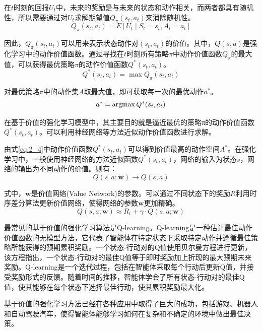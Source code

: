在$t$时刻的回报$U_t$中，未来的奖励是与未来的状态和动作相关，而两者都具有随机性，所以需要通过对$U_t$求解期望值$Q_π (s_t,a_t)$来消除随机性\cite{XTYY202012003}。
\begin{equation}
  \label{eq:2_2}
  Q_π (s_t,a_t) = E[U_t\mid S_t=s_t, A_t = a_t]
\end{equation}

因此，$Q_\pi(s_t,a_t)$可以用来表示状态动作对$(s_t,a_t)$的价值。其中，$Q(s,a)$是强化学习中的动作价值函数。通过寻找在$t$时刻所有策略$\pi$中动作价值函数$Q_\pi$的最大值，可以获得最优策略$\pi$的动作价值函数$Q^*(s_t,a_t)$。
\begin{equation}
  \label{eq:2_3}
  Q^* (s_t,a_t) = \max Q_π (s_t,a_t)
\end{equation}

对最优策略$\pi$中的动作集$A$取最大值，即可获取每一次的最优动作$a^*$。
\begin{equation}
  \label{eq:2_4}
  a^* = \operatorname*{argmax} Q^* (s_t,a_t)
\end{equation}

在基于价值的强化学习模型中，其主要目的就是逼近最优的策略π的动作价值函数$Q^* (s_t,a_t )$。可以利用神经网络等方法近似动作价值函数进行求解。

由式\ref{eq:2_4}中动作价值函数$Q^* (s_t,a_t )$可以得到价值最高的动作空间$A^*$。在强化学习中，一般使用神经网络的方法近似函数$Q^* (s_t,a_t )$，网络的输入为状态$s$，网络的输出为不同动作的价值。则有：
\begin{equation}
  \label{eq:2_5}
  Q(s,a;\mathbf{w}) \rightarrow Q(s,a)
\end{equation}

	式中，$\mathbf{w}$是价值网络(Value Network)的参数。可以通过不同状态下的奖励$R$利用时序差分算法更新价值网络，使得网络的参数$\mathbf{w}$更加精确。
\begin{equation}
  \label{eq:2_6}
  Q(s,a;\mathbf{w}) \approx R_t + \gamma \cdot Q(s,a;\mathbf{w})
\end{equation}

最常见的基于价值的强化学习算法是Q-learning。Q-learning是一种估计最佳动作价值函数的无模型方法，它代表了智能体在特定状态下采取特定动作并遵循最佳策略所能获得的预期累积奖励。一个状态-行动对的Q值使用贝尔曼方程进行更新，该方程指出，一个状态-行动对的最佳Q值等于即时奖励加上折现的最大预期未来奖励。Q-learning是一个迭代过程，包括在智能体采取每个行动后更新Q值，并接受奖励形式的反馈。随着时间的推移，智能体学会了所有状态-行动对的最佳Q值，使其能够在每个状态下选择最佳行动，使其累积奖励最大化。

基于价值的强化学习方法已经在各种应用中取得了巨大的成功，包括游戏、机器人和自动驾驶汽车，使得智能体能够学习如何在复杂和不确定的环境中做出最佳决策。


